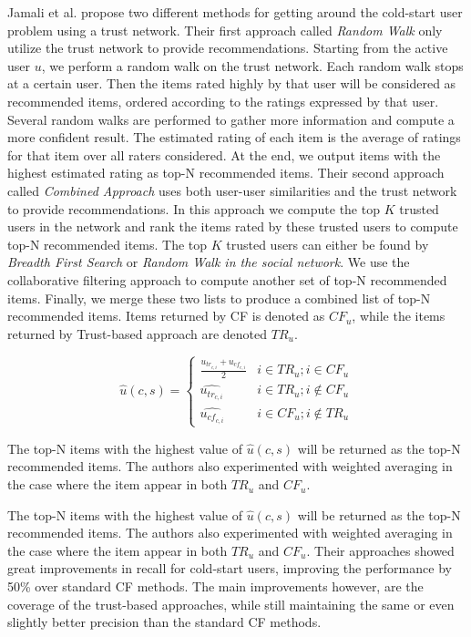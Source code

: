 Jamali et al. \cite{Jamali2009} propose two different methods for getting
around the cold-start user problem using a trust network. Their first approach
called \emph{Random Walk} only utilize the trust network to provide
recommendations. Starting from the active user $u$, we perform a random walk on
the trust network. Each random walk stops at a certain user. Then the items
rated highly by that user will be considered as recommended items, ordered
according to the ratings expressed by that user. Several random walks are
performed to gather more information and compute a more confident result. The
estimated rating of each item is the average of ratings for that item over all
raters considered. At the end, we output items with the highest estimated
rating as top-N recommended items. Their second approach called \emph{Combined
Approach} uses both user-user similarities and the trust network to provide
recommendations. In this approach we compute the top $K$ trusted users in the
network and rank the items rated by these trusted users to compute top-N
recommended items. The top $K$ trusted users can either be found by
\emph{Breadth First Search} or \emph{Random Walk in the social network}. We use
the collaborative filtering approach to compute another set of top-N
recommended items. Finally, we merge these two lists to produce a combined list
of top-N recommended items. Items returned by CF is denoted as $CF_{u}$, while
the items returned by Trust-based approach are denoted $TR_{u}$.

\begin{equation}
 \hat{u}(c,s) =
  \begin{cases}
   \frac{u_{tr_{c,i}}+u_{cf_{c,i}}}{2}     & i \in TR_{u};i \in CF_{u}         \\
   \hat{u_{tr_{c,i}}}                      & i \in TR_{u};i \not \in CF_{u}    \\
   \hat{u_{cf_{c,i}}}                      & i \in CF_{u};i \not \in TR_{u}     \end{cases}
\end{equation}

The top-N items with the highest value of $\hat{u}(c,s)$ will be returned as
the top-N recommended items. The authors also experimented with weighted
averaging in the case where the item appear in both $TR_{u}$ and $CF_{u}$.

The top-N items with the highest value of $\hat{u}(c,s)$ will be returned as
the top-N recommended items. The authors also experimented with weighted
averaging in the case where the item appear in both $TR_{u}$ and $CF_{u}$.
Their approaches showed great improvements in recall for cold-start users,
improving the performance by 50\% over standard CF methods. The main
improvements however, are the coverage of the trust-based approaches, while
still maintaining the same or even slightly better precision than the standard
CF methods.

